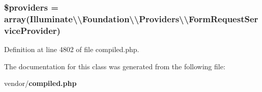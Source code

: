\subsubsection[{\$providers}]{\setlength{\rightskip}{0pt plus 5cm}\$providers = array(\textquotesingle{}Illuminate\textbackslash{}\textbackslash{}\+Foundation\textbackslash{}\textbackslash{}\+Providers\textbackslash{}\textbackslash{}\+Form\+Request\+Service\+Provider\textquotesingle{})\hspace{0.3cm}{\ttfamily [protected]}}\label{class_illuminate_1_1_foundation_1_1_bus_1_1_foundation_service_provider_a8619fb6079fbd79202034b45724fd6ca}


Definition at line 4802 of file compiled.\+php.



The documentation for this class was generated from the following file\+:\begin{DoxyCompactItemize}
\item 
vendor/{\bf compiled.\+php}\end{DoxyCompactItemize}
